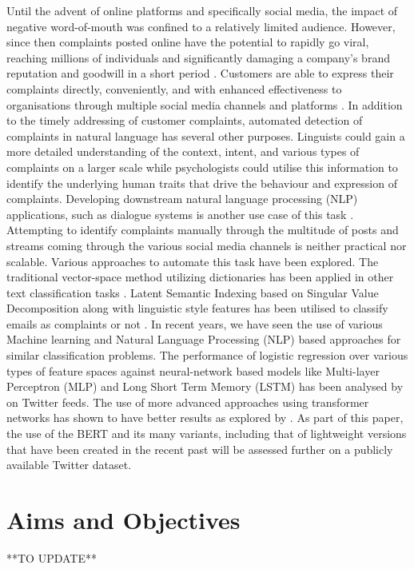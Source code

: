 \newline \newline
Until the advent of online platforms and specifically social media, the impact of negative word-of-mouth was confined to a relatively limited audience. However, since then complaints posted online have the potential to rapidly go viral, reaching millions of individuals and significantly damaging a company's brand reputation and goodwill in a short period \cite{tripp_when_2011}. Customers are able to express their complaints directly, conveniently, and with enhanced effectiveness to organisations through multiple social media channels and platforms \cite{balaji_customer_2015}.
\newline \newline
In addition to the timely addressing of customer complaints, automated detection of complaints in natural language has several other purposes. Linguists could gain a more detailed understanding of the context, intent, and various types of complaints on a larger scale while psychologists could utilise this information to identify the underlying human traits that drive the behaviour and expression of complaints. Developing downstream natural language processing (NLP) applications, such as dialogue systems is another use case of this task \cite{preotiuc-pietro_automatically_2019}.
\newline \newline
Attempting to identify complaints manually through the multitude of posts and streams coming through the various social media channels is neither practical nor scalable. Various approaches to automate this task have been explored. The traditional vector-space method utilizing dictionaries has been applied in other text classification tasks \cite{liang_dictionary-based_2006}. Latent Semantic Indexing based on Singular Value Decomposition along with linguistic style features has been utilised to classify emails as complaints or not \cite{coussement_improving_2008}. In recent years, we have seen the use of various Machine learning and Natural Language Processing (NLP) based approaches for similar classification problems. The performance of logistic regression over various types of feature spaces against neural-network based models like Multi-layer Perceptron (MLP) and Long Short Term Memory (LSTM) has been analysed by \cite{preotiuc-pietro_automatically_2019} on Twitter feeds. The use of more advanced approaches using transformer networks has shown to have better results as explored by \cite{jin_complaint_2020}. As part of this paper, the use of the BERT and its many variants, including that of lightweight versions that have been created in the recent past will be assessed further on a publicly available Twitter dataset.

\section{Aims and Objectives}

**TO UPDATE**


